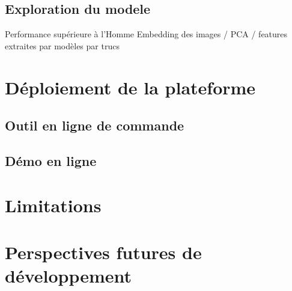 \subsection{Exploration du modele}
Performance supérieure à l'Homme
Embedding des images / PCA / features extraites par modèles par trucs

\section{Déploiement de la plateforme}
\subsection{Outil en ligne de commande}
\subsection{Démo en ligne}
\section{Limitations}
\section{Perspectives futures de développement}